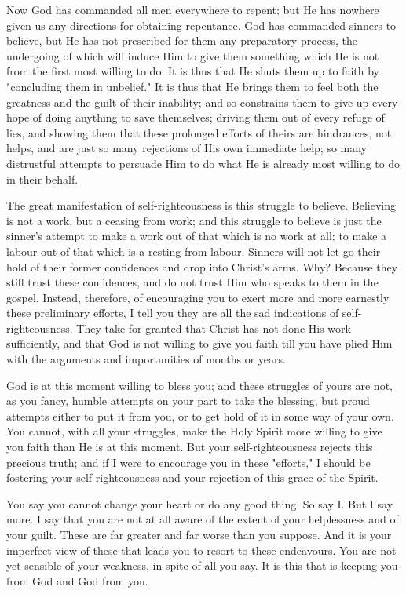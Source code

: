 \documentclass[
]{book}
\begin{document}
Now God has commanded all men everywhere to repent; but He has nowhere given us any directions for obtaining repentance. God has commanded sinners to believe, but He has not prescribed for them any preparatory process, the undergoing of which will induce Him to give them something which He is not from the first most willing to do. It is thus that He shuts them up to faith by "concluding them in unbelief." It is thus that He brings them to feel both the greatness and the guilt of their inability; and so constrains them to give up every hope of doing anything to save themselves; driving them out of every refuge of lies, and showing them that these prolonged efforts of theirs are hindrances, not helps, and are just so many rejections of His own immediate help; so many distrustful attempts to persuade Him to do what He is already most willing to do in their behalf.

The great manifestation of self-righteousness is this struggle to believe. Believing is not a work, but a ceasing from work; and this struggle to believe is just the sinner's attempt to make a work out of that which is no work at all; to make a labour out of that which is a resting from labour. Sinners will not let go their hold of their former confidences and drop into Christ's arms. Why? Because they still trust these confidences, and do not trust Him who speaks to them in the gospel. Instead, therefore, of encouraging you to exert more and more earnestly these preliminary efforts, I tell you they are all the sad indications of self-righteousness. They take for granted that Christ has not done His work sufficiently, and that God is not willing to give you faith till you have plied Him with the arguments and importunities of months or years.

God is at this moment willing to bless you; and these struggles of yours are not, as you fancy, humble attempts on your part to take the blessing, but proud attempts either to put it from you, or to get hold of it in some way of your own. You cannot, with all your struggles, make the Holy Spirit more willing to give you faith than He is at this moment. But your self-righteousness rejects this precious truth; and if I were to encourage you in these "efforts," I should be fostering your self-righteousness and your rejection of this grace of the Spirit.

You say you cannot change your heart or do any good thing. So say I. But I say more. I say that you are not at all aware of the extent of your helplessness and of your guilt. These are far greater and far worse than you suppose. And it is your imperfect view of these that leads you to resort to these endeavours. You are not yet sensible of your weakness, in spite of all you say. It is this that is keeping you from God and God from you.
\end{document}
